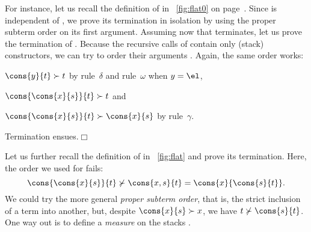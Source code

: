 For instance, let us recall the definition of
 in
\fig~\ref{fig:flat0} on page~\pageref{fig:flat0}. Since
 is independent of
, we prove its termination in isolation by using the
proper subterm order on its first argument. Assuming now that
 terminates, let us prove the termination of
. Because the recursive calls of 
contain only (stack) constructors, we can try to order their arguments
\citep{ArtsGiesl_1996}. Again, the same order works:
\begin{itemize*}

  \item \(\cons{y}{t} \succ t\) by rule~\(\delta\) and rule~\(\omega\)
    when \(y=\el\),

  \item \(\cons{\cons{x}{s}}{t} \succ t\) and

  \item \(\cons{\cons{x}{s}}{t} \succ \cons{x}{s}\) by
    rule~\(\gamma\).

\end{itemize*}
Termination ensues.\hfill\(\Box\)

Let us further recall the definition of
 in \fig~\ref{fig:flat} and
prove its termination. Here, the order we used for 
fails:
\begin{equation*}
  \cons{\cons{x}{s}}{t} \nsucc \cons{x,s}{t} =
  \cons{x}{\cons{s}{t}}.
\end{equation*}
We could try the more general \emph{proper subterm
  order}, that is, the strict
inclusion of a term into another, but, despite \(\cons{x}{s} \succ
x\), we have \(t \nsucc \cons{s}{t}\). One way out is to define a
\emph{measure} on the stacks
\citep{Giesl_1995a}.

